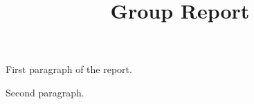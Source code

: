 \documentclass[11pt,a4paper]{article}
\title{Group Report}
\author{}
\date{}
\begin{document}
	
	\maketitle
	
	First paragraph of the report.
	
	Second paragraph.
	
\end{document}
